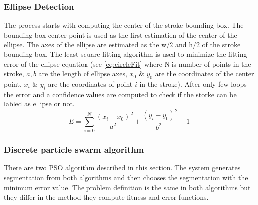 \documentclass[a4paper,10pt]{IEEEconf}
\begin{document}
\subsubsection{ Ellipse Detection } 
The process starts with computing the center of the stroke bounding box. The bounding box center point is used as the first estimation of the center of the ellipse. The axes of the ellipse are estimated as the w/2 and h/2 of the stroke bounding box. The least square fitting algorithm is used to minimize the fitting error of the ellipse equation (see \ref{eq:circleFit} where N is number of points in the stroke, $a,b$ are the length of ellipse axes, $x_0$ \& $y_0$ are the coordinates of the center point, $x_i$ \& $y_i$ are the coordinates of point $i$ in the stroke). After only few loops the error and a confidence values  are computed to check if the storke can be labled as ellipse or not.\\ %
\begin{equation}
E = \sum\limits_{i = 0}^N {\frac{{(x_i - x_0 )}}{{a^2 }}^2  + \frac{{(y_i - y_0 )}}{{b^2 }}^2  - 1} 
\label{eq:circleFit}
\end{equation}
\subsubsection{ Discrete particle swarm algorithm}
There are two PSO algorithm described in this section. The system generates segmentation from both algorithms and then chooses the segmentation with the minimum error value. The problem definition is the same in both algorithms but they differ in the method they compute fitness and error functions. %
\end{document}
